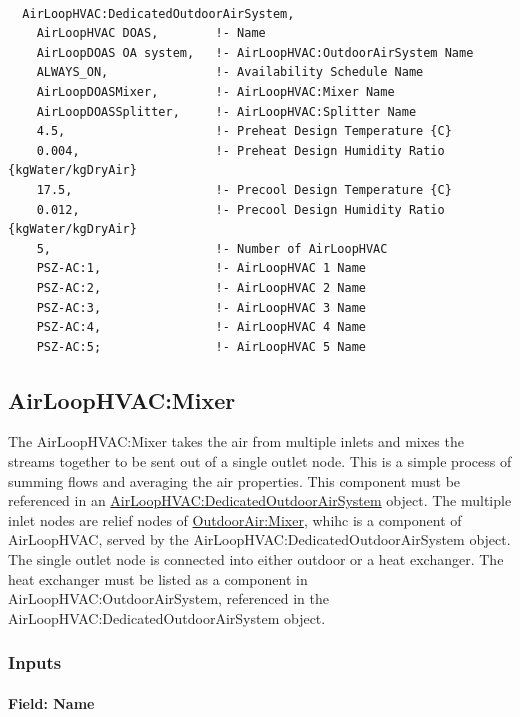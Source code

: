\begin{lstlisting}

  AirLoopHVAC:DedicatedOutdoorAirSystem,
    AirLoopHVAC DOAS,        !- Name
    AirLoopDOAS OA system,   !- AirLoopHVAC:OutdoorAirSystem Name
    ALWAYS_ON,               !- Availability Schedule Name
    AirLoopDOASMixer,        !- AirLoopHVAC:Mixer Name
    AirLoopDOASSplitter,     !- AirLoopHVAC:Splitter Name
    4.5,                     !- Preheat Design Temperature {C}
    0.004,                   !- Preheat Design Humidity Ratio {kgWater/kgDryAir}
    17.5,                    !- Precool Design Temperature {C}
    0.012,                   !- Precool Design Humidity Ratio {kgWater/kgDryAir}
    5,                       !- Number of AirLoopHVAC
    PSZ-AC:1,                !- AirLoopHVAC 1 Name
    PSZ-AC:2,                !- AirLoopHVAC 2 Name
    PSZ-AC:3,                !- AirLoopHVAC 3 Name
    PSZ-AC:4,                !- AirLoopHVAC 4 Name
    PSZ-AC:5;                !- AirLoopHVAC 5 Name
\end{lstlisting}

\subsection{AirLoopHVAC:Mixer}\label{airloophvacmixer}

The AirLoopHVAC:Mixer takes the air from multiple inlets and mixes the streams together to be sent out of a single outlet node. This is a simple process of summing flows and averaging the air properties. This component must be referenced in an \hyperref[airloophvacdedicatedoutdoorairsystem]{AirLoopHVAC:DedicatedOutdoorAirSystem} object. The multiple inlet nodes are relief nodes of \hyperref[outdoorairmixer]{OutdoorAir:Mixer}, whihc is a component of AirLoopHVAC, served by the AirLoopHVAC:DedicatedOutdoorAirSystem object. The single outlet node is connected into either outdoor or a heat exchanger. The heat exchanger must be listed as a component in AirLoopHVAC:OutdoorAirSystem, referenced in the AirLoopHVAC:DedicatedOutdoorAirSystem object. 

\subsubsection{Inputs}\label{inputs-5-002}

\paragraph{Field: Name}\label{field-name-5-002}

